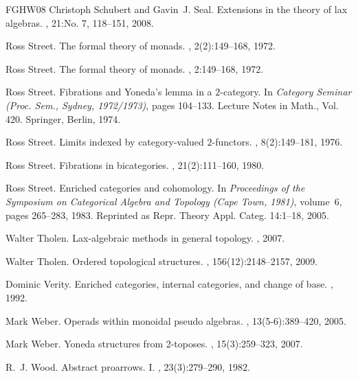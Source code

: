 \documentclass{tac}
\numberwithin{equation}{section}
\begin{document}
\begin{thebibliography}{FGHW08}
Christoph Schubert and Gavin~J. Seal.
\newblock Extensions in the theory of lax algebras.
, 21:No. 7, 118--151, 2008.

Ross Street.
\newblock The formal theory of monads.
, 2(2):149--168, 1972.

Ross Street.
\newblock The formal theory of monads.
, 2:149--168, 1972.

Ross Street.
\newblock Fibrations and {Y}oneda's lemma in a {$2$}-category.
\newblock In {\em Category Seminar (Proc. Sem., Sydney, 1972/1973)}, pages
  104--133. Lecture Notes in Math., Vol. 420. Springer, Berlin, 1974.

Ross Street.
\newblock Limits indexed by category-valued {$2$}-functors.
, 8(2):149--181, 1976.

Ross Street.
\newblock Fibrations in bicategories.
, 21(2):111--160,
  1980.

Ross Street.
\newblock Enriched categories and cohomology.
\newblock In {\em Proceedings of the Symposium on Categorical Algebra and
  Topology (Cape Town, 1981)}, volume~6, pages 265--283, 1983.
\newblock Reprinted as Repr. Theory Appl. Categ. 14:1--18, 2005.

Walter Tholen.
\newblock Lax-algebraic methods in general topology.
, 2007.

Walter Tholen.
\newblock Ordered topological structures.
, 156(12):2148--2157, 2009.

Dominic Verity.
\newblock Enriched categories, internal categories, and change of base.
, 1992.

Mark Weber.
\newblock Operads within monoidal pseudo algebras.
, 13(5-6):389--420, 2005.

Mark Weber.
\newblock Yoneda structures from 2-toposes.
, 15(3):259--323, 2007.

R.~J. Wood.
\newblock Abstract proarrows. {I}.
, 23(3):279--290,
  1982.

\end{thebibliography}
\end{document}
